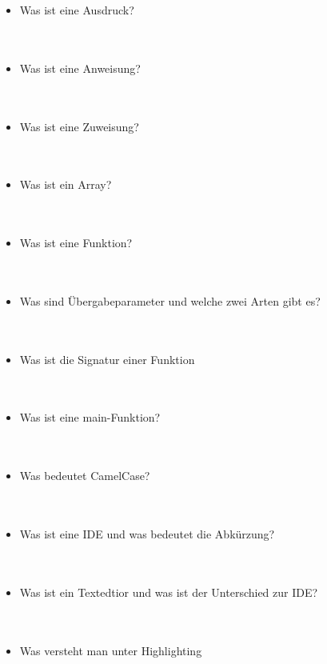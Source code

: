 \begin{itemize}
	\\
	\item{Was ist eine Ausdruck?}
	\\
	\\
	\\
	\item{Was ist eine Anweisung?}
	\\
	\\
	\\
	\item{Was ist eine Zuweisung?}
	\\
	\\
	\\
	\item{Was ist ein Array?}
	\\
	\\
	\\
	\item{Was ist eine Funktion?}
	\\
	\\
	\\
	\item{Was sind Übergabeparameter und welche zwei Arten gibt es?}
	\\
	\\
	\\
	\item{Was ist die Signatur einer Funktion}
	\\
	\\
	\\
	\item{Was ist eine main-Funktion?}
	\\
	\\
	\\
	\item{Was bedeutet CamelCase?}
	\\
	\\
	\\
	\item{Was ist eine IDE und was bedeutet die Abkürzung?}
	\\
	\\
	\\
	\item{Was ist ein Textedtior und was ist der Unterschied zur IDE?}
	\\
	\\
	\\
	\item{Was versteht man unter Highlighting}
	\\
	\\
	\\

\end{itemize}
